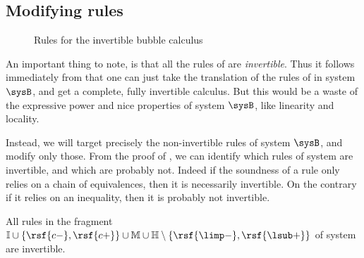 \subsection{Modifying rules}

\begin{figure*}
  
  \caption{Rules for the invertible bubble calculus }
\end{figure*}

An important thing to note, is that all the rules of  are
\emph{invertible}. Thus it follows immediately from
 that one can just take the translation of the rules
of  in system $\sysB$, and get a complete, fully invertible
calculus. But this would be a waste of the expressive power and nice properties
of system $\sysB$, like linearity and locality.

Instead, we will target precisely the non-invertible rules of system $\sysB$,
and modify only those. From the proof of , we
can identify which rules of system  are invertible, and which are
probably not. Indeed if the soundness of a rule only relies on a chain of
equivalences, then it is necessarily invertible. On the contrary if it relies on
an inequality, then it is probably not invertible.

\begin{fact}
  All rules in the fragment $\mathbb{I} \cup \{\rsf{c{-}},\rsf{c{+}}\} \cup
    \mathbb{M} \cup \mathbb{H} \setminus \{\rsf{{\limp}{-}},\rsf{{\lsub}{+}}\}$ of
  system  are invertible.
\end{fact}

